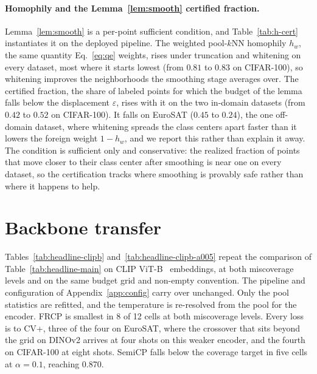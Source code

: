 \paragraph{Homophily and the Lemma~\ref{lem:smooth} certified fraction.}
Lemma~\ref{lem:smooth} is a per-point sufficient condition, and
Table~\ref{tab:h-cert} instantiates it on the deployed pipeline. The weighted
pool-$k$NN homophily $h_w$, the same quantity Eq.~\eqref{eq:qe} weights, rises
under truncation and whitening on every dataset, most where it starts lowest
(from $0.81$ to $0.83$ on CIFAR-100), so whitening improves the
neighborhoods the smoothing stage averages over. The certified fraction, the
share of labeled points for which the budget of the lemma falls below the
displacement $\varepsilon$, rises with it on the two in-domain datasets (from
$0.42$ to $0.52$ on CIFAR-100). It falls on EuroSAT ($0.45$ to $0.24$), the one
off-domain dataset, where whitening spreads the class centers apart faster
than it lowers the foreign weight $1 - h_w$, and we report this rather than
explain it away. The condition is sufficient only and
conservative: the realized fraction of points that move closer to their class
center after smoothing is near one on every dataset, so the certification
tracks where smoothing is provably safe rather than where it happens to help.



\section{Backbone transfer}
\label{app:backbones}

Tables~\ref{tab:headline-clipb} and~\ref{tab:headline-clipb-a005}
repeat the comparison of Table~\ref{tab:headline-main} on CLIP
ViT-B~\citep{radford2021clip} embeddings, at both miscoverage levels
and on the same budget grid and non-empty convention. The pipeline and
configuration of Appendix~\ref{app:config} carry over unchanged. Only
the pool statistics are refitted, and the temperature is re-resolved
from the pool for the encoder. FRCP is smallest in 8 of 12 cells at
both miscoverage levels. Every loss is to CV+, three of the four on
EuroSAT, where the crossover that sits beyond the grid on DINOv2
arrives at four shots on this weaker encoder, and the fourth on
CIFAR-100 at eight shots. SemiCP falls below the coverage target in
five cells at $\alpha = 0.1$, reaching 0.870.

